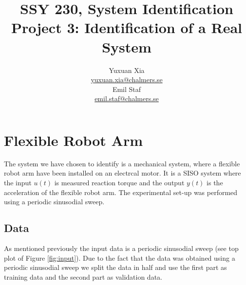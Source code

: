 \documentclass[]{article}
\title{SSY 230, System Identification\\
	Project 3: Identification of a Real System}
\author{Yuxuan Xia\\ \href{mailto:yuxuan.xia@chalmers.se}{yuxuan.xia@chalmers.se}\\Emil Staf\\\href{mailto:emil.staf@chalmers.se}{emil.staf@chalmers.se}}
\begin{document}
\maketitle


\section{Flexible Robot Arm}
The system we have chosen to identify is a mechanical system, where a flexible robot arm have been installed on an electrcal motor. It is a SISO system where the input $u(t)$ is measured reaction torque and the output $y(t)$ is the acceleration of the flexible robot arm. The experimental set-up was performed using a periodic sinusodial sweep.

\subsection{Data}
As mentioned previously the input data is a periodic sinusodial sweep (see top plot of Figure \ref{fig:input}). Due to the fact that the data was obtained using a periodic sinusodial sweep we split the data in half and use the first part as training data and the second part as validation data.
\end{document}
